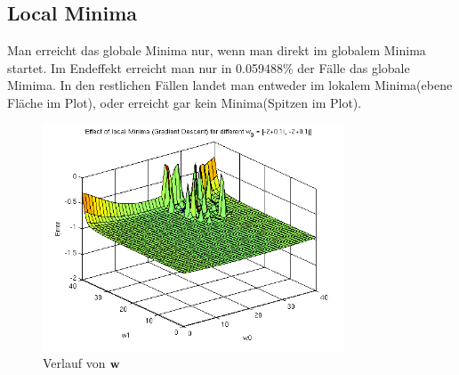 \clearpage
\newpage
\subsection{Local Minima}

Man erreicht das globale Minima nur, wenn man direkt im globalem Minima startet.
Im Endeffekt erreicht man nur in 0.059488\% der Fälle das globale Mimima. In den restlichen Fällen landet man
entweder im lokalem Minima(ebene Fläche im Plot), oder erreicht gar kein Minima(Spitzen im Plot).


\begin{figure}[h!]
  \centering
  \includegraphics[width=0.8\textwidth]{./figures/214/minf.png}
  \caption{Verlauf von $\mathbf{w}$}
  \label{fig:minf}
\end{figure}